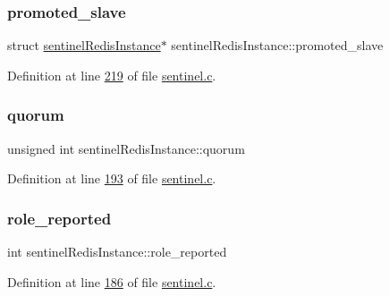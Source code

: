 \subsubsection{\texorpdfstring{promoted\+\_\+slave}{promoted\_slave}}
{\footnotesize\ttfamily struct \hyperlink{structsentinelRedisInstance}{sentinel\+Redis\+Instance}$\ast$ sentinel\+Redis\+Instance\+::promoted\+\_\+slave}



Definition at line \hyperlink{sentinel_8c_source_l00219}{219} of file \hyperlink{sentinel_8c_source}{sentinel.\+c}.

\mbox{\label{structsentinelRedisInstance_aa70077fa80e31e367f29ece1bf186095}} 
\subsubsection{\texorpdfstring{quorum}{quorum}}
{\footnotesize\ttfamily unsigned int sentinel\+Redis\+Instance\+::quorum}



Definition at line \hyperlink{sentinel_8c_source_l00193}{193} of file \hyperlink{sentinel_8c_source}{sentinel.\+c}.

\mbox{\label{structsentinelRedisInstance_a61479560bbf40fad0914630fb8154bbe}} 
\subsubsection{\texorpdfstring{role\+\_\+reported}{role\_reported}}
{\footnotesize\ttfamily int sentinel\+Redis\+Instance\+::role\+\_\+reported}



Definition at line \hyperlink{sentinel_8c_source_l00186}{186} of file \hyperlink{sentinel_8c_source}{sentinel.\+c}.

\mbox{\label{structsentinelRedisInstance_afdf67689aec6af0ddbe1a6c6a2dfc2e1}} 
